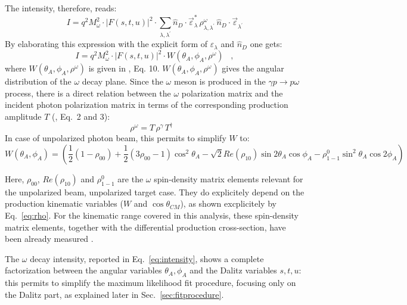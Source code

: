 \documentclass[a4paper,10pt]{report}
\newcommand{\production}{$\gamma p \rightarrow p \omega$ }
\begin{document}
The intensity, therefore, reads:
\begin{equation}
I=q^2M^2_\omega \cdot |F(s,t,u)|^2 \cdot \sum_{\lambda,\lambda^\prime} \hat{n}_D\cdot \vec{\varepsilon}^*_{\lambda} \, \rho^\omega_{\lambda,\lambda^\prime} \, \hat{n}_D\cdot \vec{\varepsilon}_{\lambda^\prime}
\end{equation}
By elaborating this expression with the explicit form of $\varepsilon_\lambda$ and $\hat{n}_D$ one gets:
\begin{equation}\label{eq:intensity}
I=q^2M^2_\omega \cdot |F(s,t,u)|^2 \cdot W(\theta_A, \phi_A, \rho^\omega) \; \; \;,
\end{equation}
where $W(\theta_A,\phi_A,\rho^\omega)$ is given in \cite{Schilling:1969um}, Eq. 10. $W(\theta_A,\phi_A,\rho^\omega)$ gives the angular distribution of the $\omega$ decay plane. 
Since the $\omega$ meson is produced in the \production process, 
there is a direct relation between the $\omega$ polarization matrix and the incident photon polarization matrix
 in terms of the corresponding production amplitude $T$  (\cite{Schilling:1969um}, Eq.~2 and 3):
\begin{equation}\label{eq:rho}
\rho^\omega=T \, \rho^\gamma \, T^\dagger \; \; \;
\end{equation}
In case of unpolarized photon beam, this permits to simplify $W$ to:
\begin{equation}
W(\theta_A,\phi_A) = (\frac{1}{2}(1-\rho_{00})+\frac{1}{2}(3\rho_{00}-1)\cos^2\theta_A -\sqrt{2}Re(\rho_{10})\sin2\theta_A \cos\phi_A -\rho^0_{1-1} \sin^{2}\theta_A \cos 2\phi_A)
\end{equation}

Here, $\rho_{00}$, $Re(\rho_{10})$ and $\rho^0_{1-1}$ are the $\omega$ spin-density matrix elements relevant for the unpolarized beam, unpolarized target case. They do explicitely depend on the production kinematic variables ($W$ and $\cos\theta_{CM}$), 
as shown excplicitely by Eq.~\ref{eq:rho}. For the kinematic range covered in this analysis, these spin-density matrix elements, together with the differential production cross-section, have been already measured \cite{Williams:2009ab}.

The $\omega$ decay intensity, reported in Eq.~\ref{eq:intensity}, shows a complete factorization between the angular variables $\theta_A,\phi_A$ and the Dalitz variables $s,t,u$: 
this permits to simplify the maximum likelihood fit procedure, focusing only on the Dalitz part, as explained later in Sec.~\ref{sec:fitprocedure}.
\end{document}
